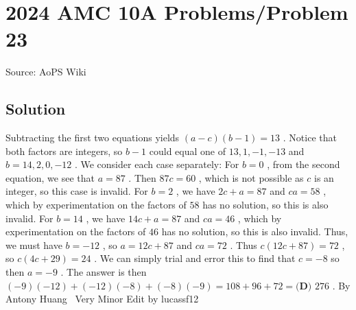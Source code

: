 \documentclass[12pt]{article}
\begin{document}
\section*{{2024 AMC 10A Problems/Problem 23}}
Source: AoPS Wiki

\subsection*{Solution}
Subtracting the first two equations yields $(a-c)(b-1)=13$ . Notice that both factors are integers, so $b-1$ could equal one of $13,1,-1,-13$ and $b=14,2,0,-12$ . We consider each case separately: For $b=0$ , from the second equation, we see that $a=87$ . Then $87c=60$ , which is not possible as $c$ is an integer, so this case is invalid. For $b=2$ , we have $2c+a=87$ and $ca=58$ , which by experimentation on the factors of $58$ has no solution, so this is also invalid. For $b=14$ , we have $14c+a=87$ and $ca=46$ , which by experimentation on the factors of $46$ has no solution, so this is also invalid. Thus, we must have $b=-12$ , so $a=12c+87$ and $ca=72$ . Thus $c(12c+87)=72$ , so $c(4c+29)=24$ . We can simply trial and error this to find that $c=-8$ so then $a=-9$ . The answer is then $(-9)(-12)+(-12)(-8)+(-8)(-9)=108+96+72=\boxed{\textbf{(D) }276}$ . By Antony Huang ~Very Minor Edit by lucassf12
\end{document}
